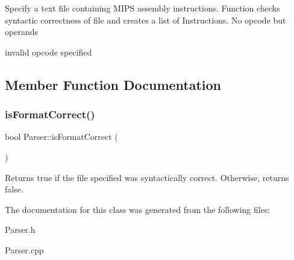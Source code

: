 Specify a text file containing M\+I\+PS assembly instructions. Function checks syntactic correctness of file and creates a list of Instructions. No opcode but operands

invalid opcode specified 

\subsection{Member Function Documentation}
\mbox{\label{class_parser_a355fb2bd3a8f68c635f89a1ca8762475}} 
\subsubsection{\texorpdfstring{is\+Format\+Correct()}{isFormatCorrect()}}
{\footnotesize\ttfamily bool Parser\+::is\+Format\+Correct (\begin{DoxyParamCaption}{ }\end{DoxyParamCaption})\hspace{0.3cm}{\ttfamily [inline]}}

Returns true if the file specified was syntactically correct. Otherwise, returns false. 

The documentation for this class was generated from the following files\+:\begin{DoxyCompactItemize}
\item 
Parser.\+h\item 
Parser.\+cpp\end{DoxyCompactItemize}
